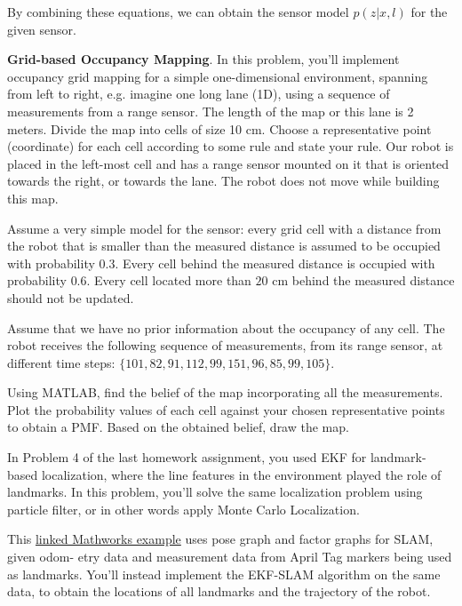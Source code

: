\documentclass[answers]{exam}
\begin{document}
\begin{questions}
\begin{solution}
    By combining these equations, we can obtain the sensor model $p(z|x, l)$ for the given sensor.

    \end{solution}

    \question[25]
    \textbf{Grid-based Occupancy Mapping}. In this problem, you'll implement occupancy grid mapping
    for a simple one-dimensional environment, spanning from left to right, e.g. imagine one long
    lane (1D), using a sequence of measurements from a range sensor. The length of the map or
    this lane is 2 meters. Divide the map into cells of size 10 cm. Choose a representative point
    (coordinate) for each cell according to some rule and state your rule. Our robot is placed in
    the left-most cell and has a range sensor mounted on it that is oriented towards the right, or
    towards the lane. The robot does not move while building this map.

    Assume a very simple model for the sensor: every grid cell with a distance from the robot
    that is smaller than the measured distance is assumed to be occupied with probability $0.3$.
    Every cell behind the measured distance is occupied with probability $0.6$. Every cell located
    more than $20$ cm behind the measured distance should not be updated.

    Assume that we have no prior information about the occupancy of any cell. The robot receives
    the following sequence of measurements, from its range sensor, at different time steps:
    $\{101, 82, 91, 112, 99, 151, 96, 85, 99, 105\}$.

    Using MATLAB, find the belief of the map incorporating all the measurements. Plot the
    probability values of each cell against your chosen representative points to obtain a PMF.
    Based on the obtained belief, draw the map.

    \begin{solution}
    \end{solution}

    \question[25]
    In Problem 4 of the last homework assignment, you used EKF for landmark-based localization, where the line features in the environment played the role of landmarks. In this problem, you'll solve the same localization problem using particle filter, or in other words apply Monte Carlo Localization.

    \begin{solution}
    \end{solution}

    \question[(Bonus) 20]
    This \href{https://www.mathworks.com/help/nav/ug/landmark-slam-using-apriltag-markers.html}{linked Mathworks example} uses pose graph and factor graphs for SLAM, given odom-
    etry data and measurement data from April Tag markers being used as landmarks. You'll
    instead implement the EKF-SLAM algorithm on the same data, to obtain the locations of all
    landmarks and the trajectory of the robot.

    \begin{solution}
    \end{solution}
\end{questions}
\end{document}
